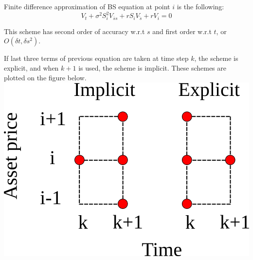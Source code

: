 \documentclass[11pt]{article} %
\begin{document}
Finite difference approximation of BS equation at point $i$ is the following:
\begin{equation}
V_t + \sigma^2 S_i^2 V_{\overline{s}s} + r S_i V_{\mathring{s}} + rV_i = 0
\end{equation}

This scheme has second order of accuracy w.r.t $s$ and first order w.r.t $t$, or $O(\delta t, \delta s^2)$.

If last three terms of previous equation are taken at time step $k$, the scheme is explicit, and when $k+1$ is used, the scheme is implicit. These schemes are plotted on the figure below.\\
\includegraphics[scale=0.5]{schemes.png}\\ 
\end{document}
